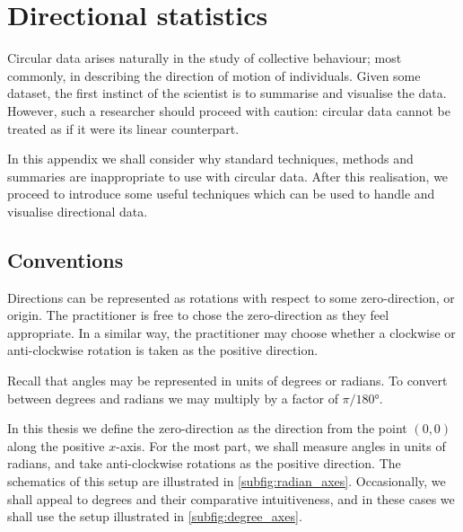 \graphicspath{{fig/circ_stats_intro/}}

\chapter{Directional statistics}	
\label{cha:direct_stats}

Circular data arises naturally in the study of collective behaviour; most commonly, in
describing the direction of motion of individuals. Given some dataset, the first
instinct of the scientist is to summarise and visualise the data. However, such a
researcher should proceed with caution: circular data cannot be treated as if it were
its linear counterpart.

In this appendix we shall consider why standard techniques, methods and summaries are
inappropriate to use with circular data. After this realisation, we proceed to introduce
some useful techniques which can be used to handle and visualise directional data.

\section{Conventions}
\label{sec:conventions}

Directions can be represented as rotations with respect to some zero-direction, or
origin. The practitioner is free to chose the zero-direction as they feel appropriate. In
a similar way, the practitioner may choose whether a clockwise or anti-clockwise rotation
is taken as the positive direction.

Recall that angles may be represented in units of degrees or radians. To convert between
degrees and radians we may multiply by a factor of $\pi/\ang{180}$.

In this thesis we define the zero-direction as the direction from the point $(0, 0)$ along
the positive $x$-axis. For the most part, we shall measure angles in units of radians, and
take anti-clockwise rotations as the positive direction. The schematics of this setup are
illustrated in \cref{subfig:radian_axes}. Occasionally, we shall appeal to degrees and
their comparative intuitiveness, and in these cases we shall use the setup illustrated in
\cref{subfig:degree_axes}.

